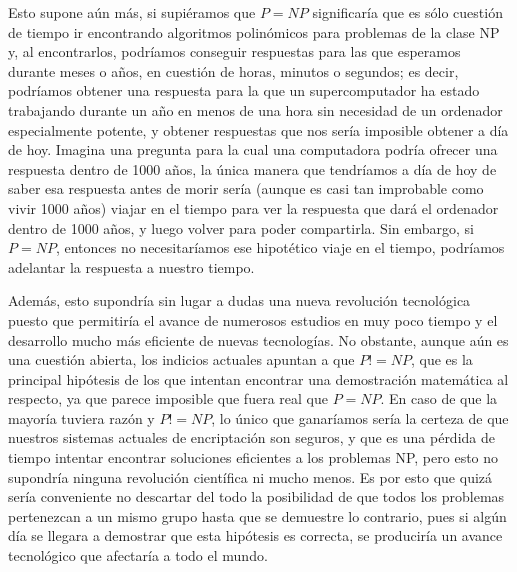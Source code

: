 \documentclass[a4paper, 11pt]{article}
\begin{document}
Esto supone aún más, si supiéramos que $P = NP$ significaría que es sólo cuestión de tiempo ir encontrando algoritmos polinómicos para problemas de la clase NP y, al encontrarlos, podríamos conseguir respuestas para las que esperamos durante meses o años, en cuestión de horas, minutos o segundos; es decir, podríamos obtener una respuesta para la que un supercomputador ha estado trabajando durante un año en menos de una hora sin necesidad de un ordenador especialmente potente, y obtener respuestas que nos sería imposible obtener a día de hoy. Imagina una pregunta para la cual una computadora podría ofrecer una respuesta dentro de 1000 años, la única manera que tendríamos a día de hoy de saber esa respuesta antes de morir sería (aunque es casi tan improbable como vivir 1000 años) viajar en el tiempo para ver la respuesta que dará el ordenador dentro de 1000 años, y luego volver para poder compartirla. Sin embargo, si $P = NP$, entonces no necesitaríamos ese hipotético viaje en el tiempo, podríamos adelantar la respuesta a nuestro tiempo.

Además, esto supondría sin lugar a dudas una nueva revolución tecnológica puesto que permitiría el avance de numerosos estudios en muy poco tiempo y el desarrollo mucho más eficiente de nuevas tecnologías. No obstante, aunque aún es una cuestión abierta, los indicios actuales apuntan a que $P != NP$, que es la principal hipótesis de los que intentan encontrar una demostración matemática al respecto, ya que parece imposible que fuera real que $P = NP$. En caso de que la mayoría tuviera razón y $P != NP$, lo único que ganaríamos sería la certeza de que nuestros sistemas actuales de encriptación son seguros, y que es una pérdida de tiempo intentar encontrar soluciones eficientes a los problemas NP, pero esto no supondría ninguna revolución científica ni mucho menos. Es por esto que quizá sería conveniente no descartar del todo la posibilidad de que todos los problemas pertenezcan a un mismo grupo hasta que se demuestre lo contrario, pues si algún día se llegara a demostrar que esta hipótesis es correcta, se produciría un avance tecnológico que afectaría a todo el mundo. 
\end{document}

